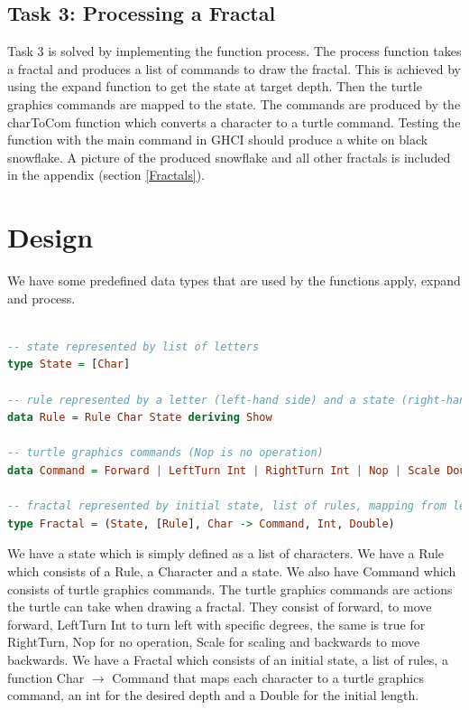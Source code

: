 \documentclass{article}
\begin{document}
\subsection{Task 3: Processing a Fractal}
Task 3 is solved by implementing the function process. The process function takes a fractal and produces a list of commands to draw the fractal. This is achieved by using the expand function to get the state at target depth. Then the turtle graphics commands are mapped to the state. The commands are produced by the charToCom function which converts a character to a turtle command. Testing the function with the main command in GHCI should produce a white on black snowflake. A picture of the produced snowflake and all other fractals is included in the appendix (section \ref{Fractals}).

\section{Design}
We have some predefined data types that are used by the functions apply, expand and process.

\begin{lstlisting}[language=Haskell]

-- state represented by list of letters
type State = [Char]

-- rule represented by a letter (left-hand side) and a state (right-hand side)
data Rule = Rule Char State deriving Show

-- turtle graphics commands (Nop is no operation)
data Command = Forward | LeftTurn Int | RightTurn Int | Nop | Scale Double | Backward deriving Show 

-- fractal represented by initial state, list of rules, mapping from letters to commands, target depth, initial length
type Fractal = (State, [Rule], Char -> Command, Int, Double)
\end{lstlisting}

We have a state which is simply defined as a list of characters. We have a Rule which consists of a Rule, a Character and a state. We also have Command which consists of turtle graphics commands. The turtle graphics commands are actions the turtle can take when drawing a fractal. They consist of forward, to move forward, LeftTurn Int to turn left with specific degrees, the same is true for RightTurn, Nop for no operation, Scale for scaling and backwards to move backwards. We have a Fractal which consists of an initial state, a list of rules, a function Char $\rightarrow$ Command that maps each character to a turtle graphics command, an int for the desired depth and a Double for the initial length.
\end{document}
